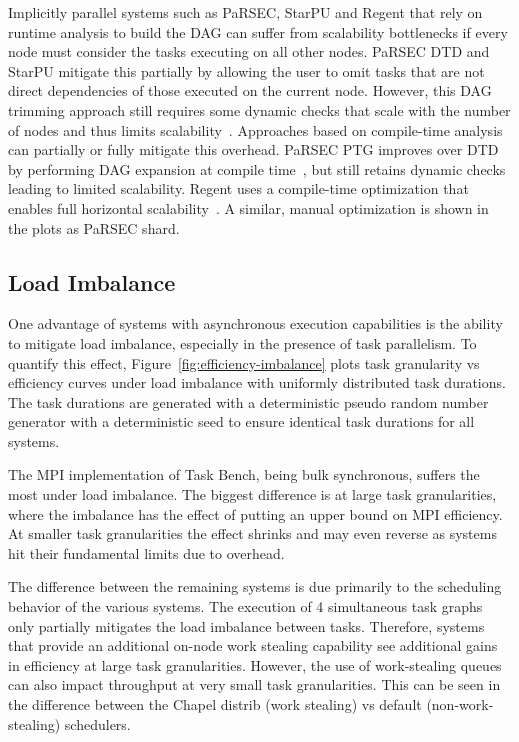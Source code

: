 Implicitly parallel systems such as PaRSEC, StarPU and Regent that
rely on runtime analysis to build the DAG can suffer from
scalability bottlenecks if every node must consider the tasks
executing on all other nodes. PaRSEC DTD and StarPU mitigate this
partially by allowing the user to omit tasks that are not direct
dependencies of those executed on the current node. However, this DAG
trimming approach still requires some dynamic checks that scale with
the number of nodes and thus limits scalability~\cite{PARSEC_DTD}. Approaches based on compile-time analysis can
partially or fully mitigate this overhead. PaRSEC PTG improves over DTD 
by performing DAG expansion at compile time~\cite{PARSEC_DTD}, but
still retains dynamic checks leading to limited scalability. Regent
uses a compile-time optimization that enables full horizontal
scalability~\cite{ControlReplication17}. A similar, manual
optimization is shown in the plots as PaRSEC shard.



\subsection{Load Imbalance}



One advantage of systems with asynchronous execution capabilities is
the ability to mitigate load imbalance, especially in the presence of
task parallelism. To quantify this effect,
Figure~\ref{fig:efficiency-imbalance} plots task granularity vs
efficiency curves under load imbalance with uniformly distributed task
durations. The task durations are generated with a deterministic
pseudo random number generator with a deterministic seed to ensure
identical task durations for all systems.

The MPI implementation of Task Bench, being bulk synchronous,
suffers the most under load imbalance. The biggest
difference is at large task granularities, where the imbalance has the
effect of putting an upper bound on MPI efficiency. At smaller task
granularities the effect shrinks and may even reverse as systems hit
their fundamental limits due to overhead.

The difference between the remaining systems is due primarily to the
scheduling behavior of the various systems. The execution of 4
simultaneous task graphs only partially mitigates the
load imbalance between tasks. Therefore, systems that provide an
additional on-node work stealing capability see additional gains in
efficiency at large task granularities. However, the use of
work-stealing queues can also impact throughput at very small task
granularities. This can be seen in the difference between the Chapel
distrib (work stealing) vs default (non-work-stealing) schedulers.

